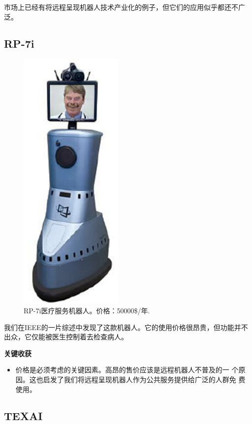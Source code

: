 市场上已经有将远程呈现机器人技术产业化的例子，但它们的应用似乎都还不广
泛。

\subsection{RP-7i}

\begin{figure}[h] 
\centering
                \includegraphics[keepaspectratio, width=2in]{Figures/ch4.rp7i.jpg}
        \caption[RP-7i]{RP-7i医疗服务机器人。价格：50000\$/年\textregistered.}
\end{figure}

我们在IEEE的一片综述中发现了这款机器人。它的使用价格很昂贵，但功能并不
出众，它仅能被医生控制着去检查病人。

\noindent \textbf{关键收获}
\begin{itemize} \tightlist
\item  价格是必须考虑的关键因素。高昂的售价应该是远程机器人不普及的一
  个原因。这也启发了我们将远程呈现机器人作为公共服务提供给广泛的人群免
  费使用。
\end{itemize}

\subsection{TEXAI}

